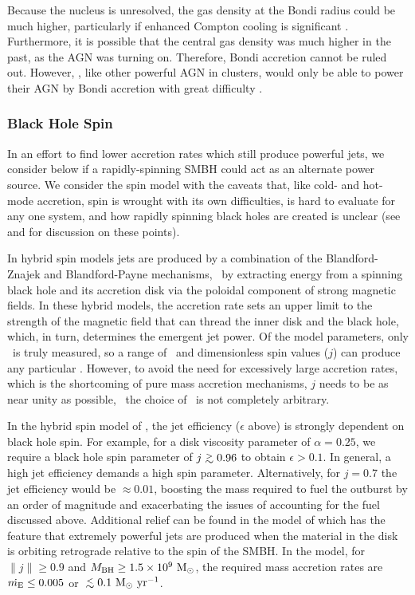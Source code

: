 \documentclass[iop]{emulateapj}
\begin{document}
Because the nucleus is unresolved, the gas density at the Bondi radius
could be much higher, particularly if enhanced Compton cooling is
significant \citep[\eg][]{2010MNRAS.402.1561R}. Furthermore, it is
possible that the central gas density was much higher in the past, as
the AGN was turning on. Therefore, Bondi accretion cannot be ruled
out. However, \rbs, like other powerful AGN in clusters, would only be
able to power their AGN by Bondi accretion with great difficulty
\citep{rafferty06, minaspin}.

\subsubsection{Black Hole Spin}

In an effort to find lower accretion rates which still produce
powerful jets, we consider below if a rapidly-spinning SMBH could act
as an alternate power source. We consider the spin model with the
caveats that, like cold- and hot-mode accretion, spin is wrought with
its own difficulties, is hard to evaluate for any one system, and how
rapidly spinning black holes are created is unclear (see
\citealt{msspin} and \citealt{minaspin} for discussion on these
points).

In hybrid spin models \citep[\eg][]{1999ApJ...522..753M,
  2001ApJ...548L...9M, 2006ApJ...651.1023R, 2007MNRAS.377.1652N,
  2009MNRAS.397.1302B, gesspin} jets are produced by a combination of
the Blandford-Znajek \citep{bz} and Blandford-Payne \citep{bp}
mechanisms, \ie\ by extracting energy from a spinning black hole and
its accretion disk via the poloidal component of strong magnetic
fields. In these hybrid models, the accretion rate sets an upper limit
to the strength of the magnetic field that can thread the inner disk
and the black hole, which, in turn, determines the emergent jet
power. Of the model parameters, only \pjet\ is truly measured, so a
range of \dme\ and dimensionless spin values ($j$) can produce any
particular \pjet. However, to avoid the need for excessively large
accretion rates, which is the shortcoming of pure mass accretion
mechanisms, $j$ needs to be as near unity as possible, \ie\ the choice
of \dme\ is not completely arbitrary.

In the hybrid spin model of \citet{2007MNRAS.377.1652N}, the jet
efficiency ($\epsilon$ above) is strongly dependent on black hole
spin. For example, for a disk viscosity parameter of $\alpha = 0.25$,
we require a black hole spin parameter of $j \ga 0.96$ to obtain
$\epsilon > 0.1$. In general, a high jet efficiency demands a high
spin parameter. Alternatively, for $j = 0.7$ the jet efficiency would
be $\approx 0.01$, boosting the mass required to fuel the outburst by
an order of magnitude and exacerbating the issues of accounting for
the fuel discussed above. Additional relief can be found in the model
of \citet{gesspin} which has the feature that extremely powerful jets
are produced when the material in the disk is orbiting retrograde
relative to the spin of the SMBH. In the \citet{gesspin} model, for
$\|j\| \ge 0.9$ and $M_{\rm{BH}} \ge 1.5 \times 10^9 ~\rm{M_{\odot}}$, the required
mass accretion rates are $\dot{m_{\rm{E}}} \le 0.005$ or $\la 0.1 ~\msolpy$.
\end{document}
